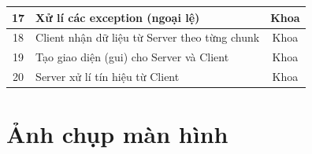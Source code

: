 \documentclass[a4paper,12pt]{report}
\begin{document}
\begin{center}
\begin{tabular}{|c|p{}|c|}
    17           & Xử lí các exception (ngoại lệ)                                                                                                                                                                                      & Khoa                     \\\hline
    18           & Client nhận dữ liệu từ Server theo từng chunk                                                                                                                                                                       & Khoa                     \\\hline
    19           & Tạo giao diện (gui) cho Server và Client                                                                                                                                                                            & Khoa                     \\\hline
    20           & Server xử lí tín hiệu từ Client                                                                                                                                                                                     & Khoa                     \\\hline
  \end{tabular}
\end{center}

\pagebreak
\section{Ảnh chụp màn hình}
\end{document}
